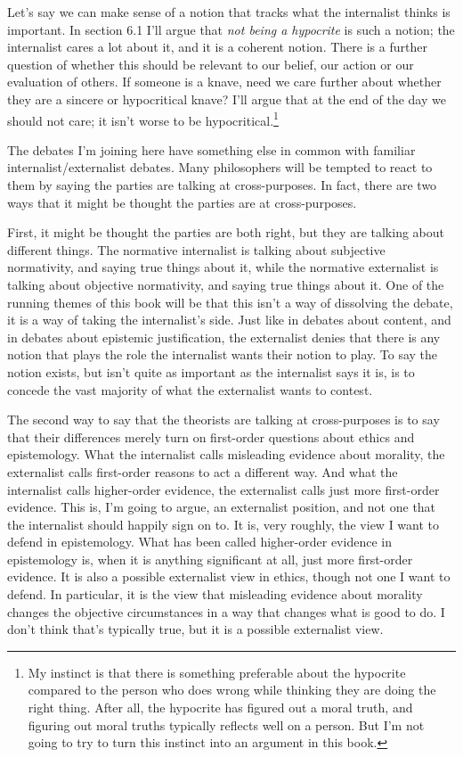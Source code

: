 \documentclass[
  10pt,
  letterpaper,
  twoside]{scrbook}
\begin{document}
Let's say we can make sense of a notion that tracks what the internalist
thinks is important. In section 6.1 I'll argue that \emph{not being a
hypocrite} is such a notion; the internalist cares a lot about it, and
it is a coherent notion. There is a further question of whether this
should be relevant to our belief, our action or our evaluation of
others. If someone is a knave, need we care further about whether they
are a sincere or hypocritical knave? I'll argue that at the end of the
day we should not care; it isn't worse to be hypocritical.\footnote{My
  instinct is that there is something preferable about the hypocrite
  compared to the person who does wrong while thinking they are doing
  the right thing. After all, the hypocrite has figured out a moral
  truth, and figuring out moral truths typically reflects well on a
  person. But I'm not going to try to turn this instinct into an
  argument in this book.}

The debates I'm joining here have something else in common with familiar
internalist/externalist debates. Many philosophers will be tempted to
react to them by saying the parties are talking at cross-purposes. In
fact, there are two ways that it might be thought the parties are at
cross-purposes.

First, it might be thought the parties are both right, but they are
talking about different things. The normative internalist is talking
about subjective normativity, and saying true things about it, while the
normative externalist is talking about objective normativity, and saying
true things about it. One of the running themes of this book will be
that this isn't a way of dissolving the debate, it is a way of taking
the internalist's side. Just like in debates about content, and in
debates about epistemic justification, the externalist denies that there
is any notion that plays the role the internalist wants their notion to
play. To say the notion exists, but isn't quite as important as the
internalist says it is, is to concede the vast majority of what the
externalist wants to contest.

The second way to say that the theorists are talking at cross-purposes
is to say that their differences merely turn on first-order questions
about ethics and epistemology. What the internalist calls misleading
evidence about morality, the externalist calls first-order reasons to
act a different way. And what the internalist calls higher-order
evidence, the externalist calls just more first-order evidence. This is,
I'm going to argue, an externalist position, and not one that the
internalist should happily sign on to. It is, very roughly, the view I
want to defend in epistemology. What has been called higher-order
evidence in epistemology is, when it is anything significant at all,
just more first-order evidence. It is also a possible externalist view
in ethics, though not one I want to defend. In particular, it is the
view that misleading evidence about morality changes the objective
circumstances in a way that changes what is good to do. I don't think
that's typically true, but it is a possible externalist view.
\end{document}

